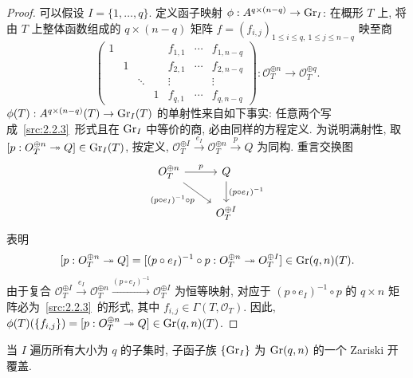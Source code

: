 \begin{proof}
可以假设 $I=\{1,\ldots,q\}$. 定义函子映射 $\phi:A^{q\times(n-q)}\to\operatorname{Gr}_I$: 在概形 $T$ 上, 将由 $T$ 上整体函数组成的 $q\times(n-q)$ 矩阵 $f=(f_{i,j})_{1\leq i\leq q,\ 1\leq j\leq n-q}$ 映至商
\begin{equation}\label{src:2.2.3}
\left(\begin{array}{cccc|ccc}
1&&&&f_{1,1}&\cdots&f_{1,n-q}\\
&1&&&f_{2,1}&\cdots&f_{2,n-q}\\
&&\ddots&&\vdots&&\vdots\\
&&&1&f_{q,1}&\cdots&f_{q,n-q}
\end{array}\right):
\mathcal O_T^{\oplus n}\longrightarrow\mathcal O_T^{\oplus q}.
\end{equation}
$\phi(T):A^{q\times(n-q)}(T)\to\operatorname{Gr}_I(T)$ 的单射性来自如下事实: 任意两个写成~\eqref{src:2.2.3}~形式且在 $\operatorname{Gr}_I$ 中等价的商, 必由同样的方程定义.
为说明满射性, 取 $[p:O_T^{\oplus n}\twoheadrightarrow Q]\in\operatorname{Gr}_I(T)$, 按定义, $\mathcal O_T^{\oplus I}\xrightarrow{e_I}\mathcal O_T^{\oplus n}\xrightarrow{p}Q$ 为同构.
重言交换图
\[
\begin{tikzcd}
\mathcal O_T^{\oplus n}\arrow[r,"p"]\arrow[dr,"(p\circ e_I)^{-1}\circ p"']&
Q\arrow[d,"(p\circ e_I)^{-1}"]\\
&\mathcal O_T^{\oplus I}
\end{tikzcd}
\]
表明
\[
[p:O_T^{\oplus n}\twoheadrightarrow Q]
=[(p\circ e_I)^{-1}\circ p:O_T^{\oplus n}\twoheadrightarrow
O_T^{\oplus I}]\in\operatorname{Gr}(q,n)(T).
\]
由于复合
$\mathcal O_T^{\oplus I}\xrightarrow{e_I}\mathcal O_T^{\oplus n}
\xrightarrow{(p\circ e_I)^{-1}}\mathcal O_T^{\oplus I}$
为恒等映射, 对应于 $(p\circ e_I)^{-1}\circ p$ 的 $q\times n$ 矩阵必为~\eqref{src:2.2.3}~的形式, 其中 $f_{i,j}\in\Gamma(T,\mathcal O_T)$.
因此, $\phi(T)(\{f_{i,j}\})=[p:O_T^{\oplus n}\twoheadrightarrow Q]\in\operatorname{Gr}(q,n)(T)$.
\end{proof}
\begin{lemma}\label{src:2.2.4}
当 $I$ 遍历所有大小为 $q$ 的子集时, 子函子族 $\{\operatorname{Gr}_I\}$ 为 $\operatorname{Gr}(q,n)$ 的一个 Zariski 开覆盖.
\end{lemma}
